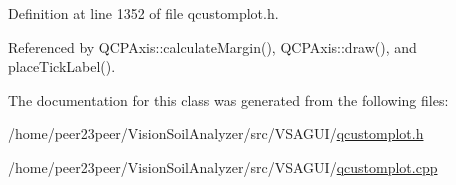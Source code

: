 Definition at line 1352 of file qcustomplot.\+h.



Referenced by Q\+C\+P\+Axis\+::calculate\+Margin(), Q\+C\+P\+Axis\+::draw(), and place\+Tick\+Label().



The documentation for this class was generated from the following files\+:\begin{DoxyCompactItemize}
\item 
/home/peer23peer/\+Vision\+Soil\+Analyzer/src/\+V\+S\+A\+G\+U\+I/\hyperlink{qcustomplot_8h}{qcustomplot.\+h}\item 
/home/peer23peer/\+Vision\+Soil\+Analyzer/src/\+V\+S\+A\+G\+U\+I/\hyperlink{qcustomplot_8cpp}{qcustomplot.\+cpp}\end{DoxyCompactItemize}
